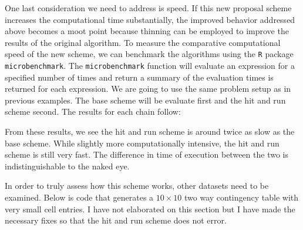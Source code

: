 \documentclass{phd}\usepackage[]{graphicx}\usepackage[]{color}
\makeatletter
\newenvironment{kframe}{%
 \def\at@end@of@kframe{}%
 \ifinner\ifhmode%
  \def\at@end@of@kframe{\end{minipage}}%
  \begin{minipage}{\columnwidth}%
 \fi\fi%
 \def\FrameCommand##1{\hskip\@totalleftmargin \hskip-\fboxsep
 \colorbox{shadecolor}{##1}\hskip-\fboxsep
     \hskip-\linewidth \hskip-\@totalleftmargin \hskip\columnwidth}%
 \MakeFramed {\advance\hsize-\width
   \@totalleftmargin\z@ \linewidth\hsize
   \@setminipage}}%
 {\par\unskip\endMakeFramed%
 \at@end@of@kframe}
\newenvironment{knitrout}{}{} %
\makeatother
\begin{document}
One last consideration we need to address is speed. If this new proposal scheme increases the computational time substantially, the improved behavior addressed above becomes a moot point because thinning can be employed to improve the results of the original algorithm. To measure the comparative computational speed of the new scheme, we can benchmark the algorithms using the \verb|R| package \verb|microbenchmark|. The \verb|microbenchmark| function will evaluate an expression for a specified number of times and return a summary of the evaluation times is returned for each expression. We are going to use the same problem setup as in previous examples. The base scheme will be evaluate first and the hit and run scheme second. The results for each chain follow:

\begin{knitrout}
\color{fgcolor}\begin{kframe}


{\ttfamily\noindent\bfseries\color{errorcolor}{\#\# Error in metropolis(tbl, moves, suffStats = suff\_stats, config = A): unused arguments (suffStats = suff\_stats, config = A)}}\end{kframe}
\end{knitrout}

From these results, we see the hit and run scheme is around twice as slow as the base scheme. While slightly more computationally intensive, the hit and run scheme is still very fast. The difference in time of execution between the two is indistinguishable to the naked eye.  

In order to truly assess how this scheme works, other datasets need to be examined. Below is code that generates a $10 \times 10$ two way contingency table with very small cell entries. I have not elaborated on this section but I have made the necessary fixes so that the hit and run scheme does not error. 
\end{document}
